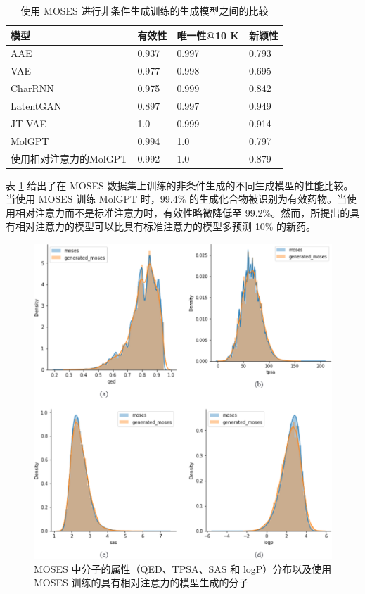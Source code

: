 \begin{table}[H]
  \centering
  \caption{使用 MOSES 进行非条件生成训练的生成模型之间的比较}
  \label{tab:1}
\begin{tabular}{llll}
\hline 模型 & 有效性 & 唯一性@10 K & 新颖性 \\
\hline AAE & 0.937 & 0.997 & 0.793 \\
VAE & 0.977 & 0.998 & 0.695 \\
CharRNN & 0.975 & 0.999 & 0.842 \\
LatentGAN & 0.897 & 0.997 & 0.949 \\
JT-VAE & 1.0 & 0.999 & 0.914 \\
MolGPT & 0.994 & 1.0 & 0.797 \\
使用相对注意力的MolGPT & 0.992 & 1.0 & 0.879 \\

\hline
\end{tabular}
\end{table}

表 \ref{tab:1} 给出了在 MOSES 数据集上训练的非条件生成的不同生成模型的性能比较。当使用 MOSES 训练 MolGPT 时，99.4\% 的生成化合物被识别为有效药物。当使用相对注意力而不是标准注意力时，有效性略微降低至 99.2\%。然而，所提出的具有相对注意力的模型可以比具有标准注意力的模型多预测 10\% 的新药。

\begin{figure}[H]
  \centering
  \includegraphics[width=\linewidth]{figures/3.png}
  \caption{MOSES 中分子的属性（QED、TPSA、SAS 和 logP）分布以及使用 MOSES 训练的具有相对注意力的模型生成的分子}
  \label{fig:3}
\end{figure}


